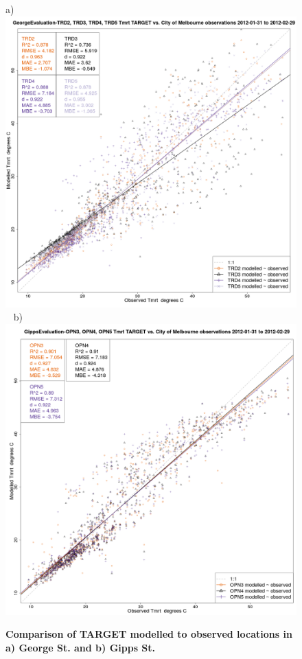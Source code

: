 \documentclass[final,3p,times,authoryear]{elsarticle}
\begin{document}
\begin{figure}[!htbp]
a) \includegraphics[scale=0.15]{images/Eval/GeorgeEvaluation-ErrorPlots-Tmrt_Single.png}
~ b)
\includegraphics[scale=0.15]{images/Eval/GippsEvaluation-ErrorPlots-Tmrt_Single.png}

\caption{\bf Comparison of TARGET modelled  to observed locations in a) George St. and b) Gipps St.}    
 \label{fig:tmrteval} 
\end{figure} 
\end{document}
